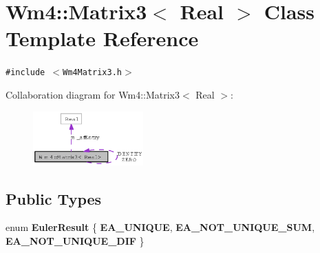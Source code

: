 \section{Wm4::Matrix3$<$ Real $>$ Class Template Reference}
\label{classWm4_1_1Matrix3}
{\tt \#include $<$Wm4Matrix3.h$>$}

Collaboration diagram for Wm4::Matrix3$<$ Real $>$:\begin{figure}[H]
\begin{center}
\leavevmode
\includegraphics[width=120pt]{classWm4_1_1Matrix3__coll__graph}
\end{center}
\end{figure}
\subsection*{Public Types}
\begin{CompactItemize}
\item 
enum {\bf Euler\-Result} \{ {\bf EA\_\-UNIQUE}, 
{\bf EA\_\-NOT\_\-UNIQUE\_\-SUM}, 
{\bf EA\_\-NOT\_\-UNIQUE\_\-DIF}
 \}
\end{CompactItemize}
